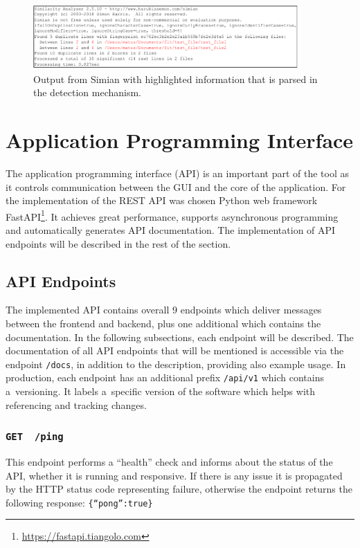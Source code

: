   \begin{figure}[h]
    \centering
    \includegraphics[width=0.9\textwidth]{obrazky-figures/cg_impl_simian_output.drawio.pdf}
    \caption{Output from Simian with highlighted information that is parsed in the detection mechanism.}
    \label{cg-impl-simian-output}
  \end{figure}

  \section{Application Programming Interface}
  The application programming interface (API) is an important part of the tool as it controls communication between the GUI
  and the core of the application. For the implementation of the REST API was chosen Python web framework FastAPI\footnote{
  \href{https://fastapi.tiangolo.com}{https://fastapi.tiangolo.com}}. It achieves great performance, supports
  asynchronous programming and automatically generates API documentation. The implementation of API endpoints
  will be described in the rest of the section.

  \subsection*{API Endpoints}
  \label{impl:api}
  The implemented API contains overall 9 endpoints which deliver messages between the frontend and backend,
  plus one additional which contains the documentation. In the following subsections, each endpoint will be described.
  The documentation of all API endpoints that will be mentioned is accessible
  via the endpoint \texttt{/docs}, in addition to the description, providing also example usage.
  In production, each endpoint has an additional prefix \texttt{/api/v1} which contains a~versioning. It labels
  a~specific version of the software which helps with referencing and tracking changes.

  \subsubsection*{\texttt{GET \ /ping}}
  This endpoint performs a ``health'' check and informs about the status of the API, whether it is running
  and responsive. If there is any issue it is propagated by the HTTP status code representing failure, otherwise the endpoint
  returns the following response: \texttt{\{``pong'':true\}}

